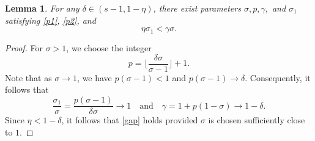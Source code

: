 \documentclass[10pt,a4paper]{amsart}
\newtheorem{lemma}{Lemma}
\begin{document}
\begin{lemma}\label{paranew}
    For any $\delta \in (s-1, 1-\eta)$, there exist parameters $\sigma, p, \gamma,$ and $\sigma_{1}$ satisfying \eqref{p1}, \eqref{p2}, and
    \begin{equation}\label{gap}
        \eta \sigma_{1} < \gamma\sigma.
    \end{equation}
\end{lemma}

\begin{proof}
    For $\sigma>1$, we choose the integer
    \begin{equation*}
        p=\bigg\lfloor \frac{\delta\sigma}{\sigma-1} \bigg\rfloor+1.
    \end{equation*}
    Note that as  $\sigma \to 1$, we have $p(\sigma-1)<1$ and $p(\sigma-1)\to \delta$. Consequently, it follows that
    \begin{equation*}
        \frac{\sigma_{1}}{\sigma} = \frac{p(\sigma-1)}{\delta \sigma} \to 1 \quad \text{and} \quad \gamma = 1+p(1-\sigma) \to 1-\delta.
    \end{equation*}
    Since $\eta < 1-\delta$, it follows that \eqref{gap} holds provided $\sigma$ is chosen sufficiently close to $1$.
\end{proof}
\end{document}
